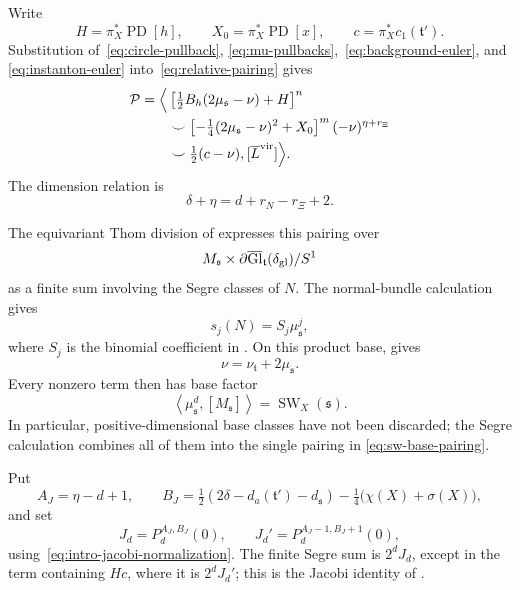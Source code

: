 \documentclass[11pt]{amsart}
\theoremstyle{definition}
\theoremstyle{remark}
\theoremstyle{plain}
\newcommand{\Gl}{\operatorname{Gl}}
\newcommand{\SW}{\operatorname{SW}}
\begin{document}
Write
\[
 H=\pi_X^*\operatorname{PD}[h],\qquad
 X_0=\pi_X^*\operatorname{PD}[x],\qquad
 c=\pi_X^*c_1(\mathfrak t').
\]
Substitution of~\eqref{eq:circle-pullback},
\eqref{eq:mu-pullbacks},~\eqref{eq:background-euler}, and
\eqref{eq:instanton-euler} into~\eqref{eq:relative-pairing} gives
\begin{align}\label{eq:pairing-integrand}
 \mathcal P=\Bigl\langle&
 \left[\tfrac12B_h(2\mu_{\mathfrak s}-\nu)+H\right]^n\notag\\
 &\smile\left[-\tfrac14(2\mu_{\mathfrak s}-\nu)^2+X_0\right]^m
 (-\nu)^{\eta+r_\Xi}\notag\\
 &\smile\tfrac12(c-\nu),[\overline L^{\mathrm{vir}}]
 \Bigr\rangle.
\end{align}
The dimension relation is
\begin{equation}\label{eq:pairing-dimension}
 \delta+\eta=d+r_N-r_\Xi+2.
\end{equation}

The equivariant Thom division of
\cite[Propositions~5.20--5.21]{FeehanLenessLevelOne} expresses this pairing
over
\[
 M_{\mathfrak s}\times
 \partial\overline{\Gl}_{\mathfrak t}(\delta_{\rm gl})/S^1
\]
as a finite sum involving the Segre classes of $N$.  The normal-bundle
calculation~\cite[Lemma~2.4]{FeehanLenessLevelOne} gives
\begin{equation}\label{eq:normal-segre}
 s_j(N)=S_j\mu_{\mathfrak s}^{j},
\end{equation}
where $S_j$ is the binomial coefficient in
\cite[Equation~(6.14)]{FeehanLenessLevelOne}.  On this product base,
\cite[Lemma~5.23]{FeehanLenessLevelOne} gives
\begin{equation}\label{eq:circle-splitting}
 \nu=\nu_{\mathfrak t}+2\mu_{\mathfrak s}.
\end{equation}
Every nonzero term then has base factor
\begin{equation}\label{eq:sw-base-pairing}
 \left\langle\mu_{\mathfrak s}^{d},[M_{\mathfrak s}]\right\rangle
 =\SW_X(\mathfrak s).
\end{equation}
In particular, positive-dimensional base classes have not been discarded;
the Segre calculation combines all of them into the single pairing in
\eqref{eq:sw-base-pairing}.

Put
\begin{equation}\label{eq:jacobi-parameters}
 A_J=\eta-d+1,\qquad
 B_J=\tfrac12(2\delta-d_a(\mathfrak t')-d_{\mathfrak s})
      -\tfrac14\bigl(\chi(X)+\sigma(X)\bigr),
\end{equation}
and set
\begin{equation}\label{eq:jacobi-values}
 J_d=P_d^{A_J,B_J}(0),\qquad
 J_d'=P_d^{A_J-1,B_J+1}(0),
\end{equation}
using~\eqref{eq:intro-jacobi-normalization}.  The finite Segre sum is
$2^dJ_d$, except in the term containing $Hc$, where it is $2^dJ_d'$;
this is the Jacobi identity of
\cite[Lemma~6.2]{FeehanLenessLevelOne}.
\end{document}

